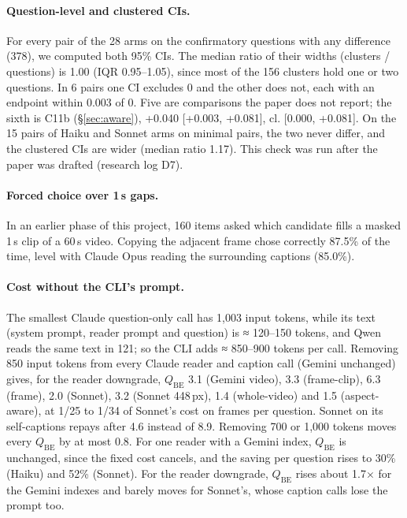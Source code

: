 \documentclass[11pt]{article}
\newcommand{\qbe}{\ensuremath{Q_{\mathrm{BE}}}}
\newcommand{\cl}{cl.}
\begin{document}
\paragraph{Question-level and clustered CIs.} For every pair of the 28 arms on the confirmatory questions with any difference (378), we computed both 95\% CIs. The median ratio of their widths (clusters / questions) is 1.00 (IQR 0.95--1.05), since most of the 156 clusters hold one or two questions. In 6 pairs one CI excludes 0 and the other does not, each with an endpoint within 0.003 of 0. Five are comparisons the paper does not report; the sixth is C11b (\S\ref{sec:aware}), +0.040 [+0.003, +0.081], \cl{} [0.000, +0.081]. On the 15 pairs of Haiku and Sonnet arms on minimal pairs, the two never differ, and the clustered CIs are wider (median ratio 1.17). This check was run after the paper was drafted (research log D7).

\paragraph{Forced choice over 1\,s gaps.} In an earlier phase of this project, 160 items asked which candidate fills a masked 1\,s clip of a 60\,s video. Copying the adjacent frame chose correctly 87.5\% of the time, level with Claude Opus reading the surrounding captions (85.0\%).

\paragraph{Cost without the CLI's prompt.} The smallest Claude question-only call has 1,003 input tokens, while its text (system prompt, reader prompt and question) is ≈ 120--150 tokens, and Qwen reads the same text in 121; so the CLI adds ≈ 850--900 tokens per call. Removing 850 input tokens from every Claude reader and caption call (Gemini unchanged) gives, for the reader downgrade, \qbe{} 3.1 (Gemini video), 3.3 (frame-clip), 6.3 (frame), 2.0 (Sonnet), 3.2 (Sonnet 448\,px), 1.4 (whole-video) and 1.5 (aspect-aware), at 1/25 to 1/34 of Sonnet's cost on frames per question. Sonnet on its self-captions repays after 4.6 instead of 8.9. Removing 700 or 1,000 tokens moves every \qbe{} by at most 0.8. For one reader with a Gemini index, \qbe{} is unchanged, since the fixed cost cancels, and the saving per question rises to 30\% (Haiku) and 52\% (Sonnet). For the reader downgrade, \qbe{} rises about 1.7× for the Gemini indexes and barely moves for Sonnet's, whose caption calls lose the prompt too.
\end{document}
